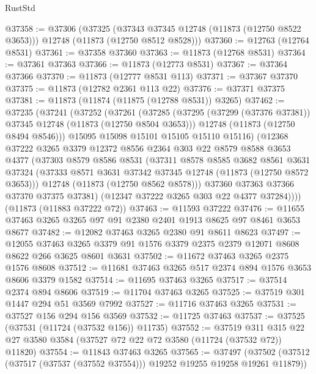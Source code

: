 \begin{lexlean}{RustStd}
\begin{coremodule}
@37358 := @37306
    (@37325
      (@37343 @37345 @12748 (@11873 (@12750 @8522 @3653)))
      @12748
      (@11873 (@12750 @8512 @8528)))
@37360 := @12763 (@12764 @8531)
@37361 := @37358 @37360
@37363 := @11873 (@12768 @8531)
@37364 := @37361 @37363
@37366 := @11873 (@12773 @8531)
@37367 := @37364 @37366
@37370 := @11873 (@12777 @8531 @113)
@37371 := @37367 @37370
@37375 := @11873 (@12782 @2361 @113 @22)
@37376 := @37371 @37375
@37381 := @11873 (@11874 (@11875 (@12788 @8531)) @3265)
@37462 := @37235
    (@37241
      (@37252
        (@37261
          (@37285
            (@37295 (@37299 (@37376 @37381)) @37345 @12748 (@11873 (@12750 @8504 @3653)))
            @12748
            (@11873 (@12750 @8494 @8546)))
          @15095
          @15098
          @15101
          @15105
          @15110
          @15116)
        (@12368
          @37222
          @3265
          @3379
          @12372
          @8556
          @2364
          @303
          @22
          @8579
          @8588
          @3653
          @4377
          (@37303
            @8579
            @8586
            @8531
            (@37311
              @8578
              @8585
              @3682
              @8561
              @3631
              @37324
              (@37333 @8571 @3631 @37342 @37345 @12748 (@11873 (@12750 @8572 @3653)))
              @12748
              (@11873 (@12750 @8562 @8578)))
            @37360
            @37363
            @37366
            @37370
            @37375
            @37381)
          (@12347 @37222 @3265 @303 @22 @4377 @37284))))
    (@11873 (@11883 @37222 @72))
@37463 := @11593 @37222
@37476 := @11655 @37463 @3265 @3265 @97 @91 @2380 @2401 @1913 @8625 @97 @8461 @3653 @8677
@37482 := @12082 @37463 @3265 @2380 @91 @8611 @8623
@37497 := @12055
    @37463
    @3265
    @3379
    @91
    @1576
    @3379
    @2375
    @2379
    @12071
    @8608
    @8622
    @266
    @3625
    @8601
    @3631
@37502 := @11672 @37463 @3265 @2375 @1576 @8608
@37512 := @11681 @37463 @3265 @517 @2374 @894 @1576 @3653 @8606 @3379 @1582
@37514 := @11695 @37463 @3265
@37517 := @37514 @2374 @894 @8606
@37519 := @11704 @37463 @3265
@37525 := @37519 @301 @1447 @294 @51 @3569 @7992
@37527 := @11716 @37463 @3265
@37531 := @37527 @156 @294 @156 @3569
@37532 := @11725 @37463
@37537 := @37525 (@37531 (@11724 (@37532 @156)) @11735)
@37552 := @37519
    @311
    @315
    @22
    @27
    @3580
    @3584
    (@37527 @72 @22 @72 @3580 (@11724 (@37532 @72)) @11820)
@37554 := @11843 @37463 @3265
@37565 := @37497
    (@37502 (@37512 (@37517 (@37537 (@37552 @37554))) @19252 @19255 @19258 @19261 @11879))

\end{coremodule}
\end{lexlean}
